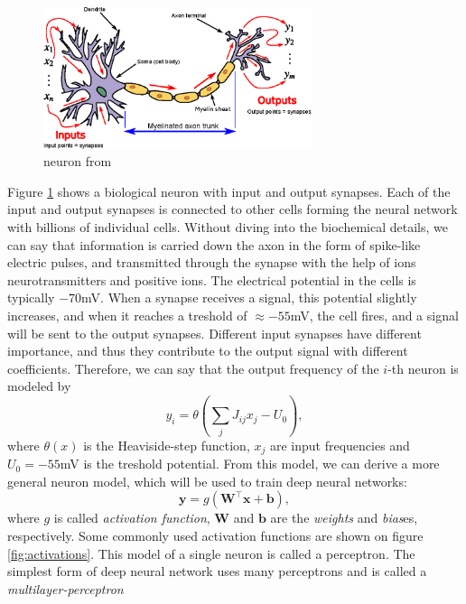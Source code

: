 \documentclass[12pt, a4paper,  nobibnotes]{article}
\begin{document}
\begin{figure}[H]
    \centering
    \includegraphics[width=0.7\textwidth]{figures/Neuron3.eps}
    \caption{neuron from \cite{wikipedianeuron}}
    \label{fig:neuron}
\end{figure}
Figure \ref{fig:neuron} shows a biological neuron with input and output synapses. Each 
of the input and output synapses is connected to other cells forming the neural 
network with billions of individual cells.
Without diving into the biochemical details, we can say that information is carried down the 
axon in the form of spike-like electric pulses, and transmitted through the synapse with 
the help of ions neurotransmitters and positive ions.
The electrical potential in the cells is typically $-70$mV. When a synapse receives a
signal, this potential slightly increases, and when it reaches a treshold of $\approx -55$mV, 
the cell fires, and a signal will be sent to the output synapses. 
Different input synapses have different importance, and thus they contribute to the 
output signal with different coefficients. Therefore, we can say that the output 
frequency of the $i$-th neuron is modeled by
\begin{equation}
    y_i = \theta\left(\sum\limits_j J_{ij}x_j - U_0\right),
\end{equation} 
where $\theta(x)$ is the Heaviside-step function, $x_j$ are input frequencies and $U_0=-55$mV is
the treshold potential.
From this model, we can derive a more general neuron model, which will be used to train 
deep neural networks:
\begin{equation}
    \mathbf y = g\left(\mathbf W^\top\mathbf x + \mathbf b\right),
\end{equation}
where $g$ is called \textit{activation function}, $\mathbf W$ and $\mathbf b$ are the 
\textit{weights} and \textit{bias}es, respectively.
Some commonly used activation functions are shown on figure \ref{fig:activations}. This model of a single neuron is called a 
perceptron. 
The simplest form of deep neural network uses many perceptrons and is called a \textit{multilayer-perceptron}
\end{document}
